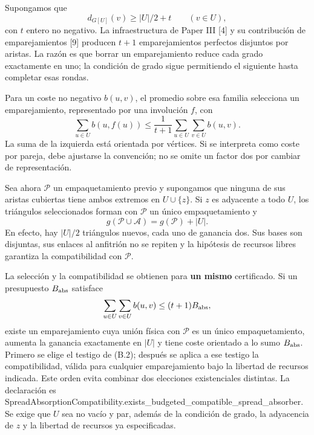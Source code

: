 \documentclass[spanish,11pt,a4paper]{article}
\begin{document}
Supongamos que \[
d_{G[U]}(v)\ge |U|/2+t\qquad(v\in U),
\tag{B.1}
\] con \(t\) entero no negativo. La infraestructura de Paper III {[}4{]} y su contribución de emparejamientos {[}9{]} producen \(t+1\) emparejamientos perfectos disjuntos por aristas. La razón es que borrar un emparejamiento reduce cada grado exactamente en uno; la condición de grado sigue permitiendo el siguiente hasta completar esas rondas.

Para un coste no negativo \(b(u,v)\), el promedio sobre esa familia selecciona un emparejamiento, representado por una involución \(f\), con \[
\sum_{u\in U}b(u,f(u))
\le\frac1{t+1}\sum_{u\in U}\sum_{v\in U}b(u,v).
\tag{B.2}
\] La suma de la izquierda está orientada por vértices. Si se interpreta como coste por pareja, debe ajustarse la convención; no se omite un factor dos por cambiar de representación.

Sea ahora \(\mathcal P\) un empaquetamiento previo y supongamos que ninguna de sus aristas cubiertas tiene ambos extremos en \(U\cup\{z\}\). Si \(z\) es adyacente a todo \(U\), los triángulos seleccionados forman con \(\mathcal P\) un único empaquetamiento y \[
g(\mathcal P\cup\mathcal A)=g(\mathcal P)+|U|.
\tag{B.3}
\] En efecto, hay \(|U|/2\) triángulos nuevos, cada uno de ganancia dos. Sus bases son disjuntas, sus enlaces al anfitrión no se repiten y la hipótesis de recursos libres garantiza la compatibilidad con \(\mathcal P\).

La selección y la compatibilidad se obtienen para \textbf{un mismo} certificado. Si un presupuesto \(B_{\rm abs}\) satisface \[
\sum_{u\in U}\sum_{v\in U}b(u,v)\le(t+1)B_{\rm abs},
\] existe un emparejamiento cuya unión física con \(\mathcal P\) es un único empaquetamiento, aumenta la ganancia exactamente en \(|U|\) y tiene coste orientado a lo sumo \(B_{\rm abs}\). Primero se elige el testigo de (B.2); después se aplica a ese testigo la compatibilidad, válida para cualquier emparejamiento bajo la libertad de recursos indicada. Este orden evita combinar dos elecciones existenciales distintas. La declaración es {\ttfamily\small SpreadAbsorp\discretionary{\hbox{\ensuremath{\hookrightarrow}}}{}{}tionCompatib\discretionary{\hbox{\ensuremath{\hookrightarrow}}}{}{}ility.\discretionary{\hbox{\ensuremath{\hookrightarrow}}}{}{}exists\_\discretionary{\hbox{\ensuremath{\hookrightarrow}}}{}{}budgeted\_\discretionary{\hbox{\ensuremath{\hookrightarrow}}}{}{}compatible\_\discretionary{\hbox{\ensuremath{\hookrightarrow}}}{}{}spread\_\discretionary{\hbox{\ensuremath{\hookrightarrow}}}{}{}absorber}. Se exige que \(U\) sea no vacío y par, además de la condición de grado, la adyacencia de \(z\) y la libertad de recursos ya especificadas.
\end{document}
